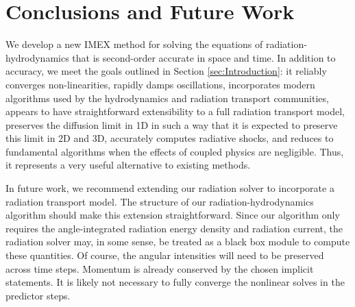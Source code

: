 \documentclass[preprint,12pt]{elsarticle}
\begin{document}
\section{Conclusions and Future Work}
\label{sec:Conclusions}

We develop a new IMEX method for solving the equations of radiation-hydrodynamics that is second-order accurate in space
and time.  In addition to accuracy, we meet the goals outlined in Section \ref{sec:Introduction}: it reliably converges
non-linearities, rapidly damps oscillations, incorporates modern algorithms used by the hydrodynamics and radiation
transport communities, appears to have straightforward extensibility to a full radiation transport model, preserves the
diffusion limit in 1D in such a way that it is expected to preserve this limit in 2D and 3D, accurately computes
radiative shocks, and reduces to fundamental algorithms when the effects of coupled physics are negligible.  Thus, it
represents a very useful alternative to existing methods.

In future work, we recommend extending our radiation solver to incorporate a radiation transport model.  The structure
of our radiation-hydrodynamics algorithm should make this extension straightforward.  Since our algorithm only requires
the angle-integrated radiation energy density and radiation current, the radiation solver may, in some sense, be treated
as a black box module to compute these quantities.  Of course, the angular intensities will need to be preserved across
time steps. Momentum is already conserved by the chosen implicit statements.  It is likely not necessary to fully
converge the nonlinear solves in the predictor steps.






\clearpage

\appendix
\end{document}

